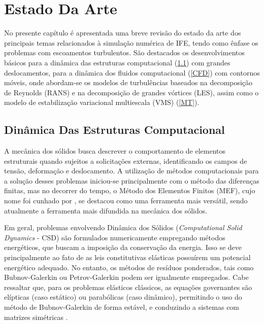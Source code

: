 \chapter{Estado Da Arte}

No presente capítulo é apresentada uma breve revisão do estado da arte dos principais temas relacionados à simulação numérica de IFE, tendo como ênfase os problemas com escoamentos turbulentos. São destacados os desenvolvimentos básicos para a dinâmica das estruturas computacional (\ref{CSD}) com grandes deslocamentos, para a dinâmica dos fluidos computacional (\ref{CFD}) com contornos móveis, onde abordam-se os modelos de turbulências baseados na decomposição de Reynolds (RANS) e na decomposição de grandes vórtices (LES), assim como o modelo de estabilização variacional multiescala (VMS) (\ref{MT}).

\section{Dinâmica Das Estruturas Computacional} \label{CSD}

A mecânica dos sólidos busca descrever o comportamento de elementos estruturais quando sujeitos a solicitações externas, identificando os campos de tensão, deformação e deslocamento. A utilização de métodos computacionais para a solução desses problemas iniciou-se principalmente com o método das diferenças finitas, mas no decorrer do tempo, o Método dos Elementos Finitos (MEF), cujo nome foi cunhado por , se destacou como uma ferramenta mais versátil, sendo atualmente a ferramenta mais difundida na mecânica dos sólidos.

Em geral, problemas envolvendo Dinâmica dos Sólidos (\textit{Computational Solid Dynamics} - CSD) são formulados numericamente empregando métodos energéticos, que buscam a imposição da conservação da energia. Isso se deve principalmente ao fato de as leis constitutivas elásticas possuírem um potencial energético adequado. No entanto, os métodos de resíduos ponderados, tais como Bubnov-Galerkin ou Petrov-Galerkin podem ser igualmente empregados. Cabe ressaltar que, para os problemas elásticos clássicos, as equações governantes são elípticas (caso estático) ou parabólicas (caso dinâmico), permitindo o uso do método de Bubnov-Galerkin de forma estável, e conduzindo a sistemas com matrizes simétricas \cite{de2012nonlinear}.

